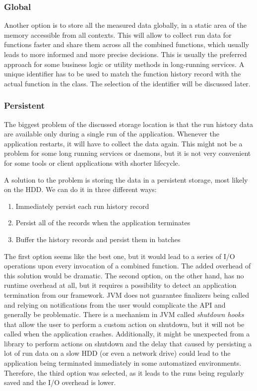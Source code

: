 \subsubsection{Global}

Another option is to store all the measured data globally, in a static area of the memory accessible from all contexts. This will allow to collect run data for functions faster and share them across all the combined functions, which usually leads to more informed and more precise decisions. This is usually the preferred approach for some business logic or utility methods in long-running services. A unique identifier has to be used to match the function history record with the actual function in the  class. The selection of the identifier will be discussed later.

\subsubsection{Persistent}

The biggest problem of the discussed storage location is that the run history data are available only during a single run of the application. Whenever the application restarts, it will have to collect the data again. This might not be a problem for some long running services or daemons, but it is not very convenient for some tools or client applications with shorter lifecycle.

A solution to the problem is storing the data in a persistent storage, most likely on the HDD. We can do it in three different ways:

\begin{enumerate}
	\item Immediately persist each run history record
	\item Persist all of the records when the application terminates
	\item Buffer the history records and persist them in batches
\end{enumerate}

The first option seems like the best one, but it would lead to a series of I/O operations upon every invocation of a combined function. The added overhead of this solution would be dramatic. The second option, on the other hand, has no runtime overhead at all, but it requires a possibility to detect an application termination from our framework. JVM does not guarantee finalizers being called and relying on notifications from the user would complicate the API and generally be problematic. There is a mechanism in JVM called \textit{shutdown hooks} that allow the user to perform a custom action on shutdown, but it will not be called when the application crashes. Additionally, it might be unexpected from a library to perform actions on shutdown and the delay that caused by persisting a lot of run data on a slow HDD (or even a network drive) could lead to the application being terminated immediately in some automatized environments.
Therefore, the third option was selected, as it leads to the runs being regularly saved and the I/O overhead is lower.

